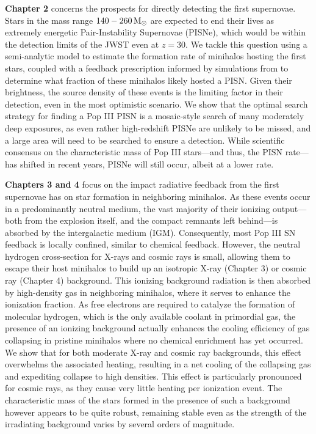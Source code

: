 \documentclass[../thesis.tex]{subfiles}
\begin{document}
\textbf{Chapter 2} concerns the prospects for directly detecting the first supernovae.  Stars in the mass range $140-260\,\mathrm{M}_{\odot}$ are expected to end their lives as extremely energetic Pair-Instability Supernovae (PISNe), which would be within the detection limits of the JWST even at $z=30$.
We tackle this question using a semi-analytic model to estimate the formation rate of minihalos hosting the first stars, coupled with a feedback prescription informed by simulations from \citet{PawlikMilosavljevicBromm2011} to determine what fraction of these minihalos likely hosted a PISN.
Given their brightness, the source density of these events is the limiting factor in their detection, even in the most optimistic scenario. 
We show that the optimal search strategy for finding a Pop III PISN is a mosaic-style search of many moderately deep exposures, as even rather high-redshift PISNe are unlikely to be missed, and a large area will need to be searched to ensure a detection.
While scientific consensus on the characteristic mass of Pop III stars---and thus, the PISN rate---has shifted in recent years, PISNe will still occur, albeit at a lower rate. 

\textbf{Chapters 3 and 4} focus on the impact radiative feedback from the first supernovae has on star formation in neighboring minihalos.  
As these events occur in a predominantly neutral medium, the vast majority of their ionizing output---both from the explosion itself, and the compact remnants left behind---is absorbed by the intergalactic medium (IGM). 
Consequently, most Pop III SN feedback is locally confined, similar to chemical feedback.  However, the neutral hydrogen cross-section for X-rays and cosmic rays is small, allowing them to escape their host minihalos to build up an isotropic X-ray (Chapter 3) or cosmic ray (Chapter 4) background.
This ionizing background radiation is then absorbed by high-density gas in neighboring minihalos, where it serves to enhance the ionization fraction.  
As free electrons are required to catalyze the formation of molecular hydrogen, which is the only available coolant in primordial gas, the presence of an ionizing background actually enhances the cooling efficiency of gas collapsing in pristine minihalos where no chemical enrichment has yet occurred.
We show that for both moderate X-ray and cosmic ray backgrounds, this effect overwhelms the associated heating, resulting in a net cooling of the collapsing gas and expediting collapse to high densities.  
This effect is particularly pronounced for cosmic rays, as they cause very little heating per ionization event.
The characteristic mass of the stars formed in the presence of such a background however appears to be quite robust, remaining stable even as the strength of the irradiating background varies by several orders of magnitude.
\end{document}
